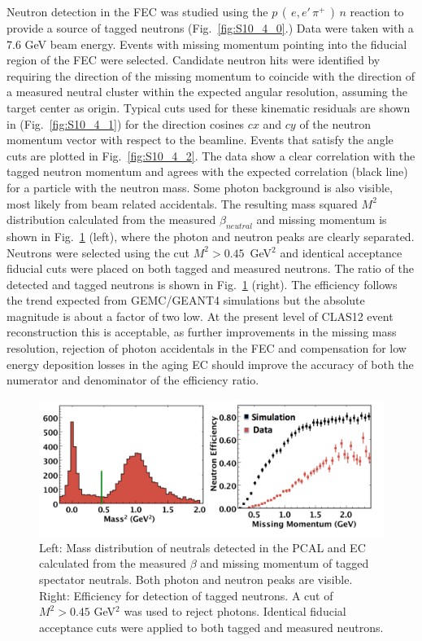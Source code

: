 Neutron detection in the FEC was studied using the $p\,(\,e,e'\,\pi^+\,)\,n$ reaction to provide a source of tagged neutrons (Fig.~\ref{fig:S10_4_0}.) Data were taken with a 7.6 GeV beam energy.  Events with missing momentum pointing into the fiducial region of the FEC were selected.  Candidate neutron hits were identified by requiring the direction of the missing momentum to coincide with the direction of a measured neutral cluster within the expected angular resolution, assuming the target center as origin.  Typical cuts used for these kinematic residuals are shown in (Fig.~\ref{fig:S10_4_1}) for the direction cosines $cx$ and $cy$ of the neutron momentum vector with respect to the beamline.  Events that satisfy the angle cuts are plotted in Fig.~\ref{fig:S10_4_2}.  The data show a clear correlation with the tagged neutron momentum and agrees with the expected correlation (black line) for a particle with the neutron mass.  Some photon background is also visible, most likely from beam related accidentals. The resulting mass squared $M^2$ distribution calculated from the measured $\beta_{neutral}$ and missing momentum is shown in Fig.~\ref{fig:S10_4_3} (left), where the photon and neutron peaks are clearly separated.  Neutrons were selected using the cut $M^2 > 0.45$~GeV$^2$ and identical acceptance fiducial cuts were placed on both tagged and measured neutrons.  The ratio of the detected and tagged neutrons is shown in Fig.~\ref{fig:S10_4_3} (right).  The efficiency follows the trend expected from GEMC/GEANT4 simulations but the absolute magnitude is about a factor of two low.  At the present level of CLAS12 event reconstruction this is acceptable, as further improvements in the missing mass resolution,  rejection of photon accidentals in the FEC and compensation for low energy deposition losses in the aging EC should improve the accuracy of both the numerator and denominator of the efficiency ratio. 

\begin{figure}[h]
\centering
\includegraphics[width=1.0\columnwidth,keepaspectratio]{img/S10_4_3.png}
\caption[]{Left: Mass distribution of neutrals detected in the PCAL and EC calculated from the measured $\beta$ and missing momentum of tagged spectator neutrals.  Both photon and neutron peaks are visible. Right: Efficiency for detection of tagged neutrons.  A cut of $M^2>0.45$ GeV$^2$ was used to reject photons.  Identical fiducial acceptance cuts were applied to both tagged and measured neutrons.}
\label{fig:S10_4_3}
\end{figure}



